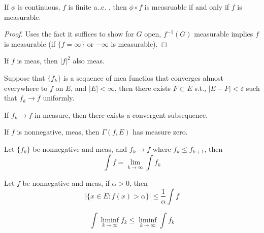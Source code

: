 \documentclass[openany]{book}
\begin{document}
\begin{thm}
    If $\phi$ is continuous, $f$ is finite a..e. , then $\phi\circ f$ is measruable if and only if $f$ is measurable.
\end{thm}
\begin{proof}
    Uses the fact it suffices to show for $G$ open, $f^{-1}(G)$ measurable implies $f$ is measurable (if $\{f=\infty\}$ or $-\infty$ is measurable).
\end{proof}

\begin{thm}[example]
    If $f$ is meas, then $|f|^2$ also meas.
\end{thm}


\begin{thm}[Egorov, 4.17]
    Suppose that $\{f_k\}$ is a sequence of mea functios that converges almost everywhere to $f$ on $E$, and $|E|<\infty$, then there exists $F\subset E$ s.t., $|E-F|<\varepsilon$ such that $f_k\to f$ uniformly.
\end{thm}



\begin{thm}[4.22]
    If $f_k\to f$ in measure, then there exists a convergent subsequence. 
\end{thm}


\begin{thm}[Lemma 5.3]
    If $f$ is nonnegative, meas, then $\Gamma(f,E)$ has measure zero.
\end{thm}


\begin{thm}[5.6 MCT]
    Let $\{f_k\}$ be nonnegative and meas, and $f_k\to f$ where $f_k\leq f_{k+1}$, then 
    \begin{equation*}
        \int f=\lim_{k\to\infty}\int f_k
    \end{equation*}
\end{thm}


\begin{thm}
    Let $f$ be nonnegative and meas, if $\alpha>0$, then 
    \begin{equation*}
        |\{x\in E: f(x)>\alpha\}|\leq\frac{1}{\alpha}\int f
    \end{equation*}
\end{thm}

\begin{thm}
    \begin{equation*}
        \int\liminf_{k\to\infty}f_k\leq\liminf_{k\to\infty}\int f_k
    \end{equation*}
\end{thm}
\end{document}
